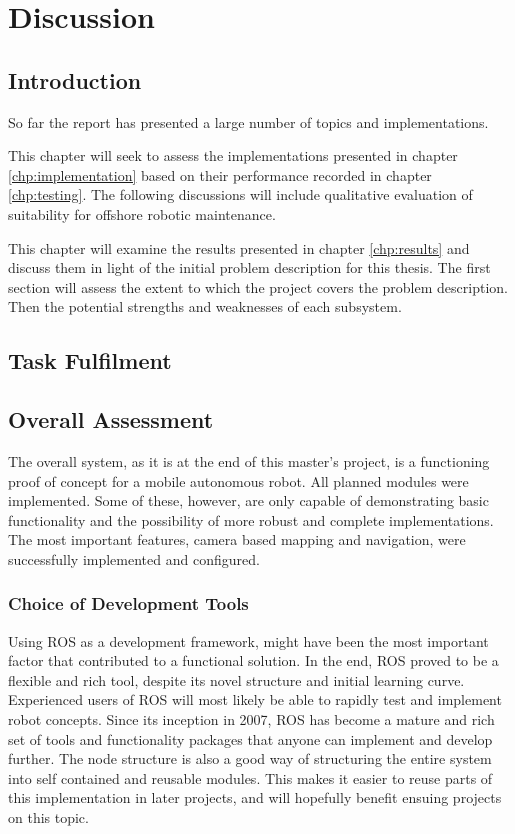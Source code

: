 \chapter{Discussion}
\label{chp:discussion} 

\section{Introduction}

So far the report has presented a large number of topics and implementations.

This chapter will seek to assess the implementations presented in chapter \ref{chp:implementation} based on their performance recorded in chapter \ref{chp:testing}. The following discussions will include qualitative evaluation of suitability for offshore robotic maintenance.

This chapter will examine the results presented in chapter \ref{chp:results} and discuss them in light of the initial problem description for this thesis. The first section will assess the extent to which the project covers the problem description. Then the potential strengths and weaknesses of each subsystem.


\section{Task Fulfilment}



\section{Overall Assessment}

The overall system, as it is at the end of this master's project, is a functioning proof of concept for a mobile autonomous robot. All planned modules were implemented. Some of these, however, are only capable of demonstrating basic functionality and the possibility of more robust and complete implementations. The most important features, camera based mapping and navigation, were successfully implemented and configured. 

\subsection{Choice of Development Tools}

Using \ac{ROS} as a development framework, might have been the most important factor that contributed to a functional solution. In the end, \ac{ROS} proved to be a flexible and rich tool, despite its novel structure and initial learning curve. Experienced users of \ac{ROS} will most likely be able to rapidly test and implement robot concepts.  Since its inception in 2007, \ac{ROS} has become a mature and rich set of tools and functionality packages that anyone can implement and develop further. The node structure is also a good way of structuring the entire system into self contained and reusable modules. This makes it easier to reuse parts of this implementation in later projects, and will hopefully benefit ensuing projects on this topic.

